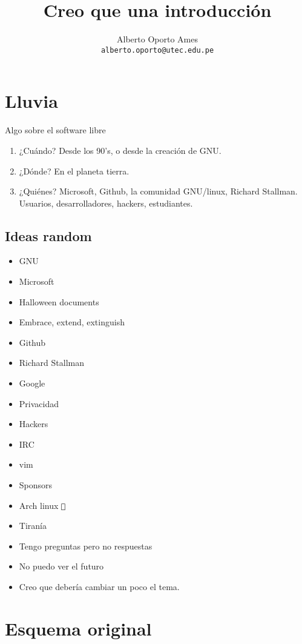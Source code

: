 \documentclass[12pt, twoside]{article}
\title{\textbf{Creo que una introducción}}
\author{
		Alberto Oporto Ames\\
		\texttt{alberto.oporto@utec.edu.pe}
		}
\newcommand{\btw}{{\color{arch}\texttt{ }} }
\begin{document}
\maketitle
\thispagestyle{fancy}

\section{Lluvia}
\label{sec:Lluvia}

Algo sobre el software libre

\begin{enumerate}
	\item ¿Cuándo?
		\subitem Desde los 90's, o desde la creación de GNU.
	\item ¿Dónde?
		\subitem En el planeta tierra.
	\item ¿Quiénes?
		\subitem Microsoft, Github, la comunidad GNU/linux, Richard Stallman.
		\subitem Usuarios, desarrolladores, hackers, estudiantes.
\end{enumerate}
\subsection{Ideas random}%
\label{sub:Ideas random}
\begin{itemize}
	\item GNU
	\item Microsoft
	\item Halloween documents
	\item Embrace, extend, extinguish
	\item Github
	\item Richard Stallman
	\item Google
	\item Privacidad
	\item Hackers
	\item IRC
	\item vim
	\item Sponsors
	\item Arch linux \btw
	\item Tiranía
	\item Tengo preguntas pero no respuestas
	\item No puedo ver el futuro
	\item Creo que debería cambiar un poco el tema.
\end{itemize}
\section{Esquema original}%
\label{sec:Esquema original}
\end{document}
